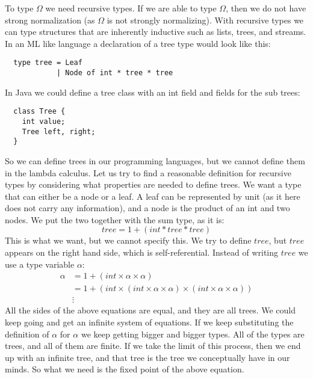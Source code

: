 To type $\Omega$ we need recursive types. If we are able to type $\Omega$, then we do not have strong normalization (as $\Omega$ is not strongly normalizing). With recursive types we can type structures that are inherently inductive such as lists, trees, and streams.  In an ML like language a declaration of a tree type would look like this:
\begin{lstlisting}
  type tree = Leaf
            | Node of int * tree * tree
\end{lstlisting}
In Java we could define a tree class with an int field and fields for the sub trees:
\begin{lstlisting}
  class Tree {
    int value;
    Tree left, right;
  }
\end{lstlisting}
So we can define trees in our programming languages, but we cannot define them in the lambda calculus. Let us try to find a reasonable definition for recursive types by considering what properties are needed to define trees. We want a type that can either be a node or a leaf. A leaf can be represented by unit (as it here does not carry any information), and a node is the product of an int and two nodes. We put the two together with the sum type, as it is:
\[
  tree = 1 + (int * tree * tree)
\]
This is what we want, but we cannot specify this. We try to define $tree$, but $tree$ appears on the right hand side, which is self-referential. Instead of writing $tree$ we use a type variable $\alpha$:
\begin{align*}
  \alpha &= 1 + (int \times \alpha \times \alpha) \\
         &= 1 + (int \times (int \times \alpha \times \alpha) \times (int \times \alpha \times \alpha)) \\
  &\vdots
\end{align*}
All the sides of the above equations are equal, and they are all trees. We could keep going and get an infinite system of equations. If we keep substituting the definition of $\alpha$ for $\alpha$ we keep getting bigger and bigger types. All of the types are trees, and all of them are finite. If we take the limit of this process, then we end up with an infinite tree, and that tree is the tree we conceptually have in our minds. So what we need is the fixed point of the above equation.

